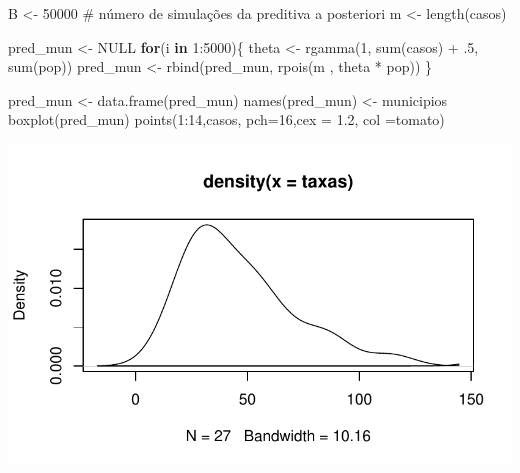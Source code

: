 \documentclass[
  letterpaper,
  DIV=11,
  numbers=noendperiod]{scrreprt}
\newenvironment{Shaded}{\begin{snugshade}}{\end{snugshade}}
\newcommand{\AttributeTok}[1]{\textcolor[rgb]{0.40,0.45,0.13}{#1}}
\newcommand{\CommentTok}[1]{\textcolor[rgb]{0.37,0.37,0.37}{#1}}
\newcommand{\ConstantTok}[1]{\textcolor[rgb]{0.56,0.35,0.01}{#1}}
\newcommand{\ControlFlowTok}[1]{\textcolor[rgb]{0.00,0.23,0.31}{\textbf{#1}}}
\newcommand{\DecValTok}[1]{\textcolor[rgb]{0.68,0.00,0.00}{#1}}
\newcommand{\FloatTok}[1]{\textcolor[rgb]{0.68,0.00,0.00}{#1}}
\newcommand{\FunctionTok}[1]{\textcolor[rgb]{0.28,0.35,0.67}{#1}}
\newcommand{\NormalTok}[1]{\textcolor[rgb]{0.00,0.23,0.31}{#1}}
\newcommand{\OtherTok}[1]{\textcolor[rgb]{0.00,0.23,0.31}{#1}}
\newcommand{\SpecialCharTok}[1]{\textcolor[rgb]{0.37,0.37,0.37}{#1}}
\newcommand{\StringTok}[1]{\textcolor[rgb]{0.13,0.47,0.30}{#1}}
\theoremstyle{definition}
\theoremstyle{definition}
\theoremstyle{plain}
\theoremstyle{remark}
\begin{document}
\begin{Shaded}
\begin{Highlighting}[]
\NormalTok{B }\OtherTok{\textless{}{-}} \DecValTok{50000} \CommentTok{\# número de simulações da preditiva a posteriori}
\NormalTok{m }\OtherTok{\textless{}{-}} \FunctionTok{length}\NormalTok{(casos)}

\NormalTok{pred\_mun }\OtherTok{\textless{}{-}} \ConstantTok{NULL}
\ControlFlowTok{for}\NormalTok{(i }\ControlFlowTok{in} \DecValTok{1}\SpecialCharTok{:}\DecValTok{5000}\NormalTok{)\{}
\NormalTok{  theta }\OtherTok{\textless{}{-}} \FunctionTok{rgamma}\NormalTok{(}\DecValTok{1}\NormalTok{, }\FunctionTok{sum}\NormalTok{(casos) }\SpecialCharTok{+}\NormalTok{ .}\DecValTok{5}\NormalTok{, }\FunctionTok{sum}\NormalTok{(pop))}
\NormalTok{  pred\_mun }\OtherTok{\textless{}{-}} \FunctionTok{rbind}\NormalTok{(pred\_mun, }\FunctionTok{rpois}\NormalTok{(m , theta }\SpecialCharTok{*}\NormalTok{ pop))}
\NormalTok{\}}

\NormalTok{pred\_mun }\OtherTok{\textless{}{-}} \FunctionTok{data.frame}\NormalTok{(pred\_mun)}
\FunctionTok{names}\NormalTok{(pred\_mun) }\OtherTok{\textless{}{-}}\NormalTok{ municipios}
\FunctionTok{boxplot}\NormalTok{(pred\_mun)}
\FunctionTok{points}\NormalTok{(}\DecValTok{1}\SpecialCharTok{:}\DecValTok{14}\NormalTok{,casos, }\AttributeTok{pch=}\DecValTok{16}\NormalTok{,}\AttributeTok{cex =} \FloatTok{1.2}\NormalTok{, }\AttributeTok{col =}\StringTok{\textquotesingle{}tomato\textquotesingle{}}\NormalTok{)}
\end{Highlighting}
\end{Shaded}

\includegraphics{poisson_files/figure-pdf/unnamed-chunk-6-1.pdf}
\end{document}
